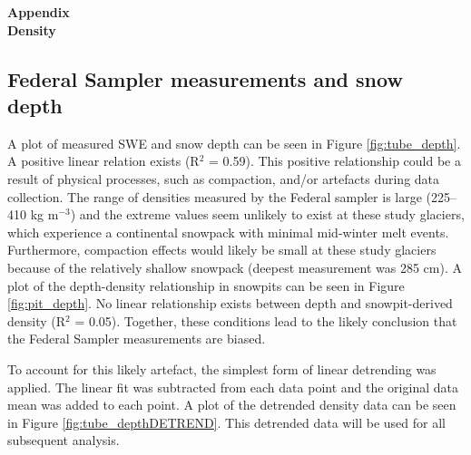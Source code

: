 \documentclass[12pt]{article}
\begin{document}

\begin{center}
\Large \textbf{Appendix\\ Density}
\end{center}

\subsection*{Federal Sampler measurements and snow depth}

A plot of measured SWE and snow depth can be seen in Figure \ref{fig:tube_depth}. A positive linear relation exists (R$^2$ = 0.59). This positive relationship could be a result of physical processes, such as compaction, and/or artefacts during data collection. The range of densities measured by the Federal sampler is large (225--410 kg m$^{-3}$) and the extreme values seem unlikely to exist at these study glaciers, which experience a continental snowpack with minimal mid-winter melt events. Furthermore, compaction effects would likely be small at these study glaciers because of the relatively shallow snowpack (deepest measurement was 285 cm). A plot of the depth-density relationship in snowpits can be seen in Figure \ref{fig:pit_depth}. No linear relationship exists between depth and snowpit-derived density (R$^2$ = 0.05). Together, these conditions lead to the likely conclusion that the Federal Sampler measurements are biased. 

To account for this likely artefact, the simplest form of linear detrending was applied. The linear fit was subtracted from each data point and the original data mean was added to each point. A plot of the detrended density data can be seen in Figure \ref{fig:tube_depthDETREND}. This detrended data will be used for all subsequent analysis. 
\end{document}
